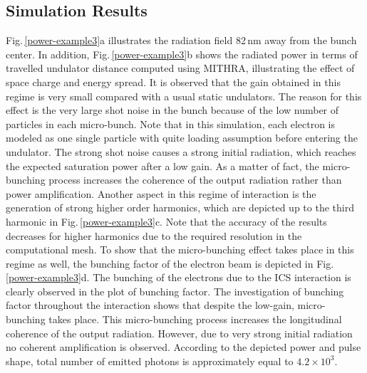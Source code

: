 \subsection{Simulation Results}

Fig.\,\ref{power-example3}a illustrates the radiation field 82\,nm away from the bunch center.
%
In addition, Fig.\,\ref{power-example3}b shows the radiated power in terms of travelled undulator distance computed using MITHRA, illustrating the effect of space charge and energy spread.
%
It is observed that the gain obtained in this regime is very small compared with a usual static undulators.
%
The reason for this effect is the very large shot noise in the bunch because of the low number of particles in each micro-bunch.
%
Note that in this simulation, each electron is modeled as one single particle with quite loading assumption before entering the undulator.
%
The strong shot noise causes a strong initial radiation, which reaches the expected saturation power after a low gain.
%
As a matter of fact, the micro-bunching process increases the coherence of the output radiation rather than power amplification.
%
Another aspect in this regime of interaction is the generation of strong higher order harmonics, which are depicted up to the third harmonic in Fig.\,\ref{power-example3}c.
%
Note that the accuracy of the results decreases for higher harmonics due to the required resolution in the computational mesh.
%
To show that the micro-bunching effect takes place in this regime as well, the bunching factor of the electron beam is depicted in Fig.\,\ref{power-example3}d.
%
The bunching of the electrons due to the ICS interaction is clearly observed in the plot of bunching factor.
%
The investigation of bunching factor throughout the interaction shows that despite the low-gain, micro-bunching takes place. This micro-bunching process increases the longitudinal coherence of the output radiation. However, due to very strong initial radiation no coherent amplification is observed.
%
According to the depicted power and pulse shape, total number of emitted photons is approximately equal to $4.2\times10^3$.
%
